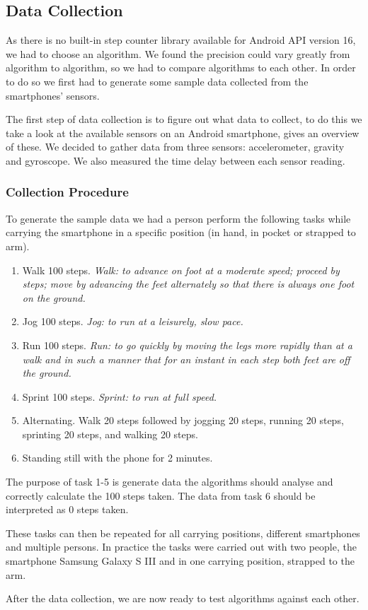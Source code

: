 \subsection{Data Collection}
As there is no built-in step counter library available for Android API version 16, we had to choose an algorithm. We found the precision could vary greatly from algorithm to algorithm, so we had to compare algorithms to each other. In order to do so we first had to generate some sample data collected from the smartphones' sensors. 

The first step of data collection is to figure out what data to collect, to do this we take a look at the available sensors on an Android smartphone, \citet{android:sensor} gives an overview of these. We decided to gather data from three sensors: accelerometer, gravity and gyroscope. We also measured the time delay between each sensor reading.

\subsubsection{Collection Procedure}
To generate the sample data we had a person perform the following tasks while carrying the smartphone in a specific position (in hand, in pocket or strapped to arm).
\begin{enumerate}
\item Walk 100 steps. \textit{Walk: to advance on foot at a moderate speed; proceed by steps; move by advancing the feet alternately so that there is always one foot on the ground.}\citep[Walk]{dict:reference} %
\item Jog 100 steps. \textit{Jog: to run at a leisurely, slow pace.}\citep[Jog]{dict:reference} %
\item Run 100 steps. \textit{Run: to go quickly by moving the legs more rapidly than at a walk and in such a manner that for an instant in each step both feet are off the ground.}\citep[Run]{dict:reference} %
\item Sprint 100 steps. \textit{Sprint: to run at full speed.}\citep[Sprint]{dict:reference} %
\item Alternating. Walk 20 steps followed by jogging 20 steps, running 20 steps, sprinting 20 steps, and walking 20 steps.
\item Standing still with the phone for 2 minutes.
\end{enumerate}

The purpose of task 1-5 is generate data the algorithms should analyse and correctly calculate the 100 steps taken. The data from task 6 should be interpreted as 0 steps taken.

These tasks can then be repeated for all carrying positions, different smartphones and multiple persons. In practice the tasks were carried out with two people, the smartphone Samsung Galaxy S III and in one carrying position, strapped to the arm.

After the data collection, we are now ready to test algorithms against each other.